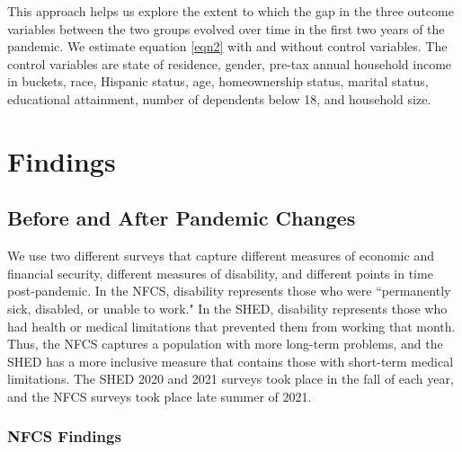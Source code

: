 \documentclass[12pt]{article}
\begin{document}
This approach helps us explore the extent to which the gap in the three outcome variables between the two groups evolved over time in the first two years of the pandemic. We estimate equation \ref{eqn2} with and without  control variables. The control variables are state of residence, gender, pre-tax annual household income in buckets, race, Hispanic status, age, homeownership status, marital status, educational attainment, number of dependents below 18, and household size.



\section{Findings}
\subsection{Before and After Pandemic Changes}
We use two different surveys that capture different measures of economic and financial security, different measures of disability, and different points in time post-pandemic. In the NFCS, disability represents those who were ``permanently sick, disabled, or unable to work." In the SHED, disability represents those who had health or medical limitations that prevented them from working that month. Thus, the NFCS captures a population with  more long-term problems, and the SHED has a more inclusive measure that contains those with short-term medical limitations. The SHED 2020 and 2021 surveys took place in the fall of each year, and the NFCS surveys took place late summer of 2021. 

\subsubsection{NFCS Findings}
\end{document}
